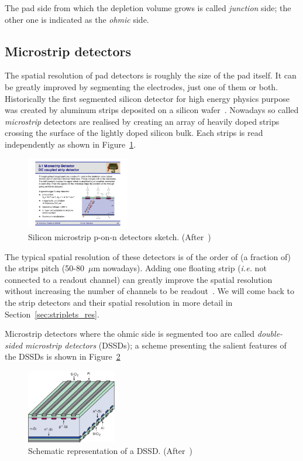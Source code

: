 The pad side from which the depletion volume grows is called {\it junction} side; the other 
one is indicated as the {\it ohmic} side.

\subsection{Microstrip detectors}
\label{sec:microstrips}
The spatial resolution of pad detectors is roughly the size of the pad itself.
 It can be greatly improved by segmenting the electrodes, just one of 
them or both. 
  Historically the first segmented silicon detector for high energy physics purpose was created by 
 aluminum strips deposited on a silicon wafer~\cite{Amendolia}. 
Nowadays so called {\it microstrip} detectors are realised by creating an array of heavily doped 
strips crossing the surface 
 of the lightly doped silicon bulk. Each strips is read independently as shown in Figure~\ref{fig:strips}.
 
 \begin{figure}[htbp]
   \centering
   \includegraphics[width=0.4\textwidth]{Strips.pdf} 
      \caption{\label{fig:strips} Silicon microstrip p-on-n detectors sketch. (After~\cite{Krammer})}
\end{figure}
 
 The typical spatial resolution of these detectors is of the order of (a fraction of) the strips pitch 
 (50-80~$\mu$m nowadays).
 Adding one floating strip ({\it i.e.} not connected to a readout channel) can greatly 
 improve the spatial resolution without increasing the number of channels to be 
 readout~\cite{TURCHETTA}. We will come back to the strip detectors and their spatial resolution in 
 more detail in 
 Section~\ref{sec:striplets_res}.
 
 Microstrip detectors where  the ohmic side is segmented too  are called {\it double-sided microstrip 
 detectors} (DSSDs); a scheme presenting the salient features of the DSSDs is shown in 
 Figure~\ref{fig:DSSD}
  \begin{figure}[htbp]
   \centering
   \includegraphics[width=0.35\textwidth]{DSSD.pdf} 
      \caption{\label{fig:DSSD} Schematic representation of a DSSD. (After~\cite{Krammer})}
\end{figure}

